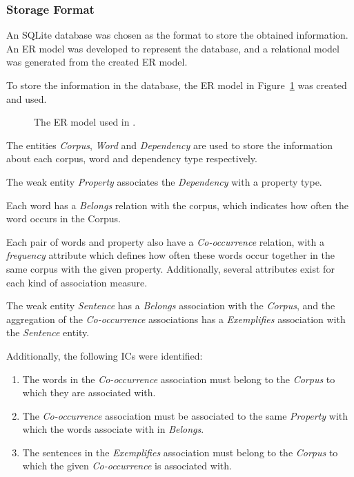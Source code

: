 \subsubsection*{Storage Format}

An SQLite database was chosen as the format to store the obtained information.
An \ac{ER} model was developed to represent the database, and a relational model
was generated from the created \ac{ER} model.

To store the information in the database, the \ac{ER} model in
Figure~\ref{fig:correira2015er} was created and used.

\begin{figure}[ht]
 \caption[ER model of (Correia et al. 2015)]{The \ac{ER} model used in
 \citep{correia2015syntax}.}
 \label{fig:correira2015er}
 \centering
 
\end{figure}

The entities \textit{Corpus}, \textit{Word} and \textit{Dependency} are used to
store the information about each corpus, word and dependency type respectively.

The weak entity \textit{Property} associates the \textit{Dependency} with a
property type.

Each word has a \textit{Belongs} relation with the corpus, which indicates how
often the word occurs in the Corpus.

Each pair of words and property also have a \textit{Co-occurrence} relation,
with a \textit{frequency} attribute which defines how often these words occur
together in the same corpus with the given property. Additionally, several
attributes exist for each kind of association measure.

The weak entity \textit{Sentence} has a \textit{Belongs} association with the
\textit{Corpus}, and the aggregation of the \textit{Co-occurrence} associations
has a \textit{Exemplifies} association with the \textit{Sentence} entity.

Additionally, the following \acp{IC} were identified:

\begin{enumerate}
  \item The words in the \textit{Co-occurrence} association must belong to the
\textit{Corpus} to which they are associated with.
  \item The \textit{Co-occurrence} association must be associated to the same
\textit{Property} with which the words associate with in \textit{Belongs}.
  \item The sentences in the \textit{Exemplifies} association must belong to the
\textit{Corpus} to which the given \textit{Co-occurrence} is associated with.
\end{enumerate}

